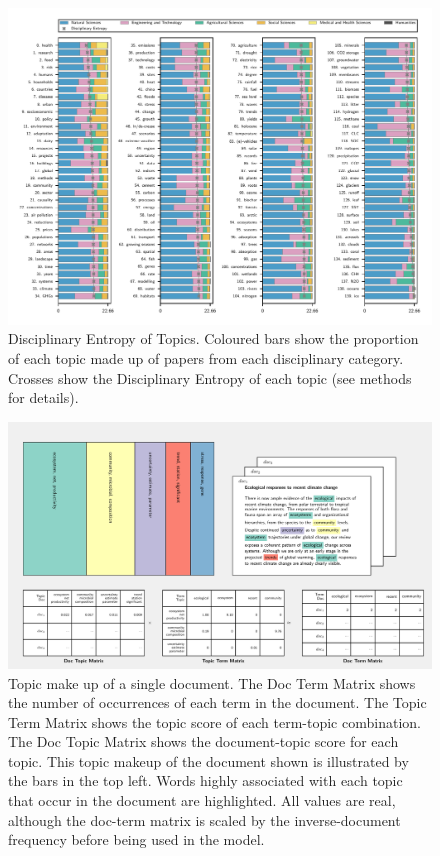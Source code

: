 \documentclass{article}
\begin{document}
	\begin{figure}
		\begin{center}
			\includegraphics[width=1\linewidth]{../plots_pub/topic_oecd_entropy.pdf}
			\caption{Disciplinary Entropy of Topics. Coloured bars show the proportion of each topic made up of papers from each disciplinary category. Crosses show the Disciplinary Entropy of each topic (see methods for details).}
			\label{dis-entropy}
		\end{center}
	\end{figure}	
	
	
	
	\begin{figure}
		\begin{center}
			\includegraphics[width=1\linewidth]{../plots_pub/single_doc_3_536594_1861.pdf}
			\caption{Topic make up of a single document. The Doc Term Matrix shows the number of occurrences of each term in the document. The Topic Term Matrix shows the topic score of each term-topic combination. The Doc Topic Matrix shows the document-topic score for each topic. This topic makeup of the document shown is illustrated by the bars in the top left. Words highly associated with each topic that occur in the document are highlighted. All values are real, although the doc-term matrix is scaled by the inverse-document frequency before being used in the model.}
			\label{doc-topic}
		\end{center}
	\end{figure}
	
\end{document}
